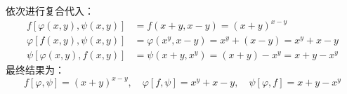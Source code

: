 \begin{solution}
    依次进行复合代入：
    \begin{equation*}
        \begin{aligned}
            f[\varphi(x, y), \psi(x, y)] & = f(x+y, x-y) = (x+y)^{x-y}                     \\
            \varphi[f(x, y), \psi(x, y)] & = \varphi(x^y, x-y) = x^y + (x-y) = x^y + x - y \\
            \psi[\varphi(x, y), f(x, y)] & = \psi(x+y, x^y) = (x+y) - x^y = x + y - x^y
        \end{aligned}
    \end{equation*}
    最终结果为：
    \begin{equation*}
        \boxed{f[\varphi, \psi] = (x+y)^{x-y}, \quad \varphi[f, \psi] = x^y + x - y, \quad \psi[\varphi, f] = x + y - x^y}
    \end{equation*}
\end{solution}


